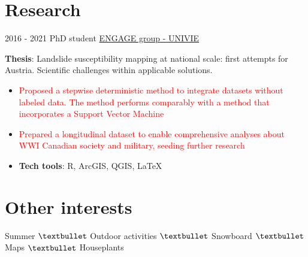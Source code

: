\documentclass[letterpaper]{twentysecondcv} %
\begin{document}
\section{Research}
\begin{twenty}
	\twentyitem
    	{2016 - 2021}
		{}
        {PhD student}
        {\href{https://geographie.univie.ac.at/arbeitsgruppen/engage-geomorphologische-systeme-und-risikoforschung/}{ENGAGE group - UNIVIE}}
        {}
        {
       	\textbf{Thesis}: Landslide susceptibility mapping at national scale: first attempts for Austria. Scientific challenges within applicable solutions.
        {\begin{itemize}
        \item \textcolor{red}{Proposed a stepwise deterministic method to integrate datasets without labeled data. The method performs comparably with a method that incorporates a Support Vector Machine}
        \item \textcolor{red}{Prepared a longitudinal dataset to enable comprehensive analyses about WWI Canadian society and military, seeding further research}
        \item \textbf{Tech tools}: R, ArcGIS, QGIS, \large \LaTeX
		\end{itemize}}
        }
\end{twenty}

\section{Other interests}
\begin{center} Summer $\textbullet$ Outdoor activities $\textbullet$ Snowboard $\textbullet$ Maps $\textbullet$ Houseplants  \\ 
\vspace{2mm}
\faCoffee \hspace*{0.5cm} \faBeer \hspace*{0.5cm}\faSpotify \hspace*{0.5cm}\faSunO \hspace*{0.5cm}\faBicycle \hspace*{0.5cm}\faGraduationCap  \hspace*{0.5cm} \faMapMarker \hspace*{0.5cm}\faMap \hspace*{0.5cm}\faPlane \hspace*{0.5cm}\faRoad \hspace*{0.5cm}\faSignal \hspace*{0.5cm} \faLineChart  \hspace*{0.5cm}\faUniversity
\end{center}

\end{document}
